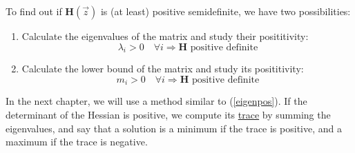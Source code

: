 \documentclass[../convex_optimization.tex]{subfiles}
\theoremstyle{definition} \newtheorem{defi}{Def}
\theoremstyle{definition} \newtheorem{prop}{Prop}
\begin{document}
To find out if $\mathbf H(\vec{z})$ is (at least) positive semidefinite,
we have two possibilities:
\begin{enumerate}
    \item Calculate the eigenvalues of the matrix and study their posititivity:
        \begin{equation}
            \lambda_i > 0 \quad \forall i \Rightarrow \mathbf H \text{ positive definite}
            \label{eigenpos}
        \end{equation}
    \item Calculate the lower bound of the matrix and study its posititivity:
        \begin{equation}
            m_i > 0 \quad \forall i \Rightarrow \mathbf H \text{ positive definite}
        \end{equation}
\end{enumerate}
In the next chapter, we will use a method similar to (\ref{eigenpos}).
If the determinant of the Hessian is positive, we compute its
\underline{trace} by summing the eigenvalues, and say that a solution
is a minimum if the trace is positive, and a maximum if the trace is negative.
\end{document}
